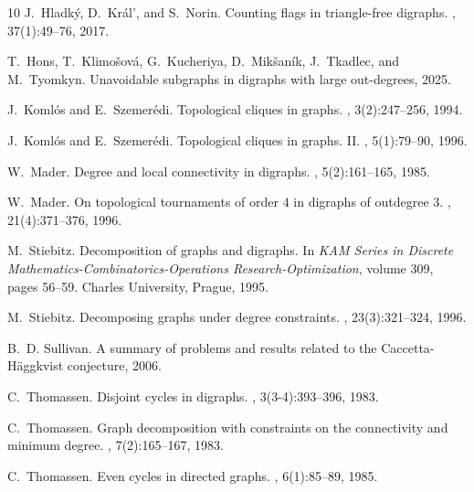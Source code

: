 \documentclass[a4paper,11pt]{article}
\theoremstyle{definition}
\begin{document}
\begin{thebibliography}{10}
J.~Hladk\'y, D.~Kr\'al', and S.~Norin.
\newblock Counting flags in triangle-free digraphs.
, 37(1):49--76, 2017.

T.~Hons, T.~Klimošová, G.~Kucheriya, D.~Mikšaník, J.~Tkadlec, and M.~Tyomkyn.
\newblock Unavoidable subgraphs in digraphs with large out-degrees, 2025.

J.~Koml\'os and E.~Szemer\'edi.
\newblock Topological cliques in graphs.
, 3(2):247--256, 1994.

J.~Koml\'os and E.~Szemer\'edi.
\newblock Topological cliques in graphs. {II}.
, 5(1):79--90, 1996.

W.~Mader.
\newblock Degree and local connectivity in digraphs.
, 5(2):161--165, 1985.

W.~Mader.
\newblock On topological tournaments of order {$4$} in digraphs of outdegree {$3$}.
, 21(4):371--376, 1996.

M.~Stiebitz.
\newblock Decomposition of graphs and digraphs.
\newblock In {\em KAM Series in Discrete Mathematics-Combinatorics-Operations Research-Optimization}, volume 309, pages 56--59. Charles University, Prague, 1995.

M.~Stiebitz.
\newblock Decomposing graphs under degree constraints.
, 23(3):321--324, 1996.

B.~D. Sullivan.
\newblock A summary of problems and results related to the {C}accetta-{H\"a}ggkvist conjecture, 2006.

C.~Thomassen.
\newblock Disjoint cycles in digraphs.
, 3(3-4):393--396, 1983.

C.~Thomassen.
\newblock Graph decomposition with constraints on the connectivity and minimum degree.
, 7(2):165--167, 1983.

C.~Thomassen.
\newblock Even cycles in directed graphs.
, 6(1):85--89, 1985.

\end{thebibliography}
\end{document}
